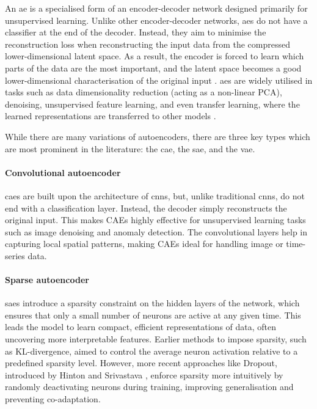 An \acrlong{ae} is a specialised form of an encoder-decoder network designed primarily for unsupervised learning. Unlike other encoder-decoder networks, \acrlong{ae}s do not have a classifier at the end of the decoder. Instead, they aim to minimise the reconstruction loss when reconstructing the input data from the compressed lower-dimensional latent space. As a result, the encoder is forced to learn which parts of the data are the most important, and the latent space becomes a good lower-dimensional characterisation of the original input \cite{ng_sparseautoencoder_2011newpdf_2010}. \Acrlong{ae}s are widely utilised in tasks such as data dimensionality reduction (acting as a non-linear PCA), denoising, unsupervised feature learning, and even transfer learning, where the learned representations are transferred to other models \cite{goodfellow_deep_2016}.

While there are many variations of autoencoders, there are three key types which are most prominent in the literature: the \acrfull{cae}, the \acrfull{sae}, and the \acrfull{vae}.

\paragraph{Convolutional autoencoder} \acrshort{cae}s are built upon the architecture of \acrshort{cnn}s, but, unlike traditional \acrshort{cnn}s, do not end with a classification layer. Instead, the decoder simply reconstructs the original input. This makes CAEs highly effective for unsupervised learning tasks such as image denoising and anomaly detection. The convolutional layers help in capturing local spatial patterns, making CAEs ideal for handling image or time-series data.

\paragraph{Sparse autoencoder} \acrshort{sae}s introduce a sparsity constraint on the hidden layers of the network, which ensures that only a small number of neurons are active at any given time. This leads the model to learn compact, efficient representations of data, often uncovering more interpretable features. Earlier methods to impose sparsity, such as KL-divergence, aimed to control the average neuron activation relative to a predefined sparsity level. However, more recent approaches like Dropout, introduced by Hinton and Srivastava \cite{hinton_improving_2012, srivastava_dropout_2014}, enforce sparsity more intuitively by randomly deactivating neurons during training, improving generalisation and preventing co-adaptation.


